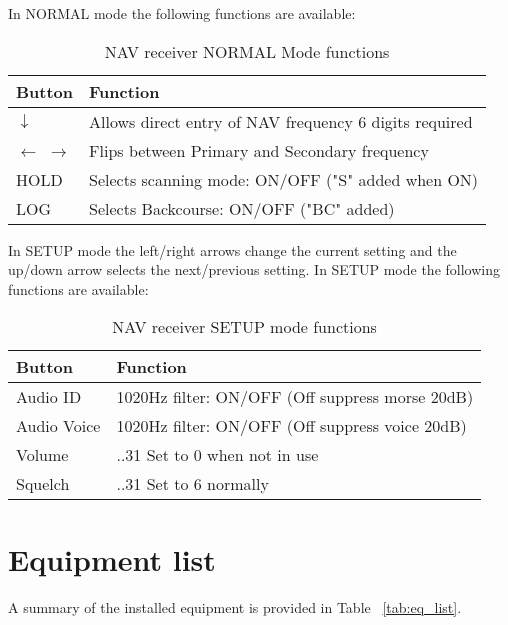 In NORMAL mode the following functions are available:
\begin{table}[H]
\caption{NAV receiver NORMAL Mode functions}
\label{tab:nav_normal}
\begin{tabularx}{\linewidth}{
    |>{\hsize=0.2\hsize}X| 
     >{\hsize=0.8\hsize}X| 
     } 
\hline
Button &Function \\
\hline
$\downarrow$ &Allows direct entry of NAV frequency 6 digits required\\
\hline
$\leftarrow$ $\rightarrow$ &Flips between Primary and Secondary frequency \\
\hline
HOLD &Selects scanning mode: ON/OFF ("S" added when ON)\\
\hline
LOG &Selects Backcourse: ON/OFF ("BC" added)\\
\hline
\end{tabularx}
\end{table}

In SETUP mode the left/right arrows change the current setting and the up/down arrow selects the next/previous setting.  In SETUP mode the following functions are available:
\begin{table}[H]
\caption{NAV receiver SETUP mode functions}
\label{tab:nav_setup}
\begin{tabularx}{\linewidth}{
    |>{\hsize=0.2\hsize}X| 
     >{\hsize=0.8\hsize}X| 
     } 
\hline
Button &Function \\
\hline
 Audio ID &1020Hz filter: ON/OFF (Off suppress morse 20dB)\\
\hline
 Audio Voice &1020Hz filter: ON/OFF (Off suppress voice 20dB)\\
\hline
 Volume &0..31 Set to 0 when not in use\\
\hline
 Squelch &0..31 Set to 6 normally\\
\hline
\end{tabularx}
\end{table}

\section{Equipment list}
A summary of the installed equipment is provided in Table ~\ref{tab:eq_list}.  

